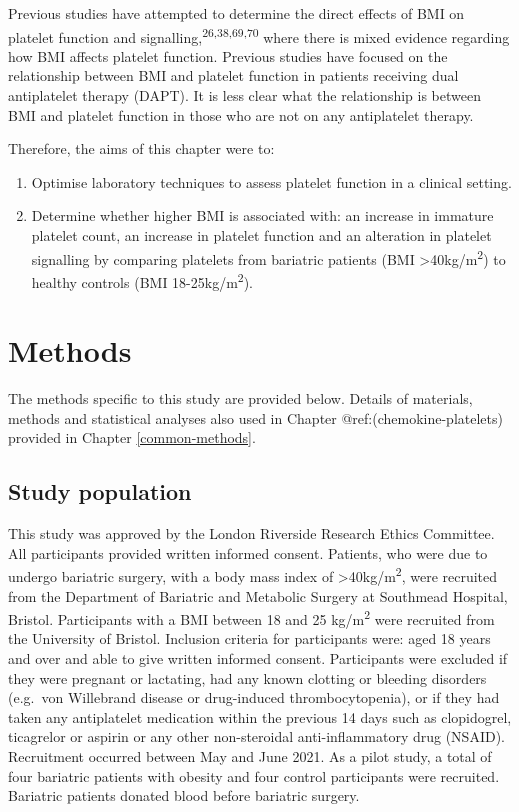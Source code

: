 \documentclass[11pt,twoside]{bristolthesis}
\providecommand{\tightlist}{%
  \setlength{\itemsep}{0pt}\setlength{\parskip}{0pt}}
\begin{document}
Previous studies have attempted to determine the direct effects of BMI on platelet function and signalling,\textsuperscript{26,38,69,70} where there is mixed evidence regarding how BMI affects platelet function. Previous studies have focused on the relationship between BMI and platelet function in patients receiving dual antiplatelet therapy (DAPT). It is less clear what the relationship is between BMI and platelet function in those who are not on any antiplatelet therapy.

Therefore, the aims of this chapter were to:
\begin{enumerate}
\def\labelenumi{\arabic{enumi})}
\tightlist
\item
  Optimise laboratory techniques to assess platelet function in a clinical setting.
\item
  Determine whether higher BMI is associated with: an increase in immature platelet count, an increase in platelet function and an alteration in platelet signalling by comparing platelets from bariatric patients (BMI \textgreater40kg/m\textsuperscript{2}) to healthy controls (BMI 18-25kg/m\textsuperscript{2}).
\end{enumerate}
\hypertarget{methods-1}{%
\section{Methods}\label{methods-1}}

The methods specific to this study are provided below. Details of materials, methods and statistical analyses also used in Chapter @ref:(chemokine-platelets) provided in Chapter \ref{common-methods}.

\hypertarget{study-population-1}{%
\subsection{Study population}\label{study-population-1}}

This study was approved by the London Riverside Research Ethics Committee. All participants provided written informed consent. Patients, who were due to undergo bariatric surgery, with a body mass index of \textgreater40kg/m\textsuperscript{2}, were recruited from the Department of Bariatric and Metabolic Surgery at Southmead Hospital, Bristol. Participants with a BMI between 18 and 25 kg/m\textsuperscript{2} were recruited from the University of Bristol. Inclusion criteria for participants were: aged 18 years and over and able to give written informed consent. Participants were excluded if they were pregnant or lactating, had any known clotting or bleeding disorders (e.g.~von Willebrand disease or drug-induced thrombocytopenia), or if they had taken any antiplatelet medication within the previous 14 days such as clopidogrel, ticagrelor or aspirin or any other non-steroidal anti-inflammatory drug (NSAID). Recruitment occurred between May and June 2021. As a pilot study, a total of four bariatric patients with obesity and four control participants were recruited. Bariatric patients donated blood before bariatric surgery.
\end{document}
